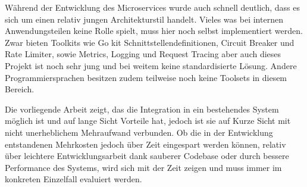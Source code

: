 Während der Entwicklung des Microservices wurde auch schnell deutlich, dass es sich um einen relativ jungen Architekturstil handelt. Vieles was bei internen Anwendungsteilen keine Rolle spielt, muss hier noch selbst implementiert werden. Zwar bieten Toolkits wie Go kit\cite{gokit} Schnittstellendefinitionen, Circuit Breaker und Rate Limiter, sowie Metrics, Logging und Request Tracing aber auch dieses Projekt ist noch sehr jung und bei weitem keine standardisierte Lösung. Andere Programmiersprachen besitzen zudem teilweise noch keine Toolsets in diesem Bereich.

Die vorliegende Arbeit zeigt, das die Integration in ein bestehendes System möglich ist und auf lange Sicht Vorteile hat, jedoch ist sie auf Kurze Sicht mit nicht unerheblichem Mehraufwand verbunden. Ob die in der Entwicklung entstandenen Mehrkosten jedoch über Zeit eingespart werden können, relativ über leichtere Entwicklungsarbeit dank sauberer Codebase oder durch bessere Performance des Systems, wird sich mit der Zeit zeigen und muss immer im konkreten Einzelfall evaluiert werden.
